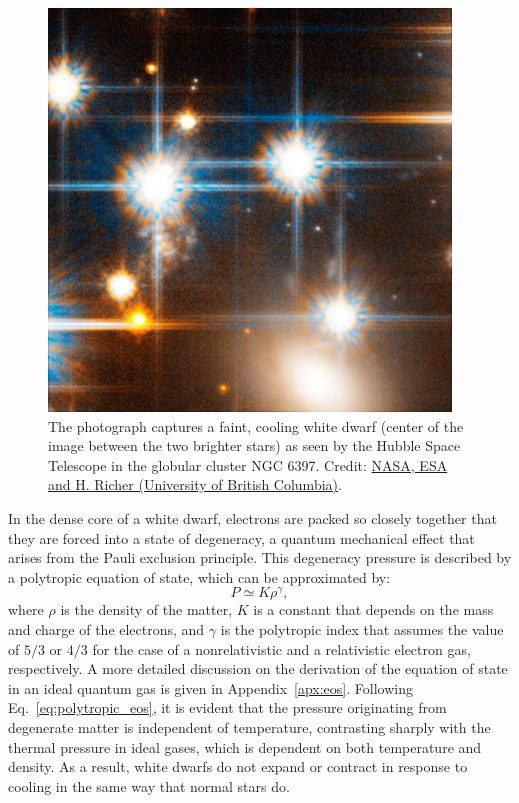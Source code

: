 \documentclass[main.tex]{subfiles}
\begin{document}
    \begin{figure}[th!]
        \centering
        \includegraphics[scale=0.6]{figures/chapter1/wd_ngc6397.jpeg}
        \caption{The photograph captures a faint, cooling white dwarf (center of the image between the two brighter stars) as seen by the Hubble Space Telescope in the globular cluster NGC 6397. Credit: \href{https://esahubble.org/images/heic0608c/}{NASA, ESA and H. Richer (University of British Columbia)}.}
        \label{fig:wd_ngc6397}
    \end{figure}
    
    In the dense core of a white dwarf, electrons are packed so closely together that they are forced into a state of degeneracy, a quantum mechanical effect that arises from the Pauli exclusion principle. This degeneracy pressure is described by a polytropic equation of state, which can be approximated by:
    \begin{equation}\label{eq:polytropic_eos}
        P \simeq K \rho^\gamma,
    \end{equation}
    where $\rho$ is the density of the matter, $K$  is a constant that depends on the mass and charge of the electrons, and $\gamma$ is the polytropic index that assumes the value of $5/3$ or $4/3$ for the case of a nonrelativistic and a relativistic electron gas, respectively. A more detailed discussion on the derivation of the equation of state in an ideal quantum gas is given in Appendix~\ref{apx:eos}.
    Following Eq.~\eqref{eq:polytropic_eos}, it is evident that the pressure originating from degenerate matter is independent of temperature, contrasting sharply with the thermal pressure in ideal gases, which is dependent on both temperature and density. As a result, white dwarfs do not expand or contract in response to cooling in the same way that normal stars do.
\end{document}
